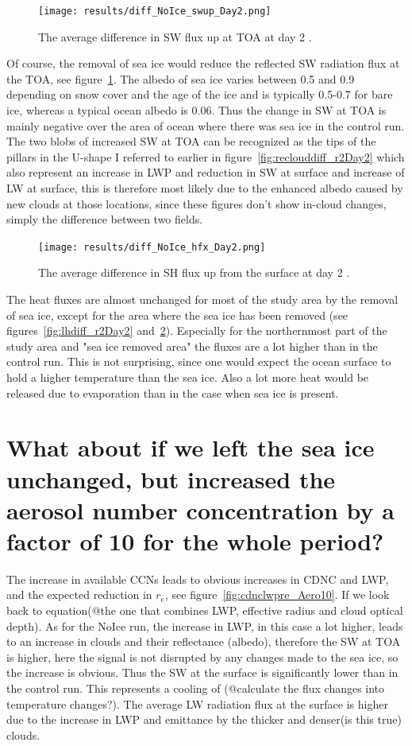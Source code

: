 \begin{figure}
\centering
\texttt{[image: results/diff\_NoIce\_swup\_Day2.png]}
\caption{The average difference in SW flux up at TOA at day 2 .}
\label{fig:swupdiff_r2Day2}
\end{figure}
Of course, the removal of sea ice would reduce the reflected SW radiation flux at the TOA, see figure~\ref{fig:swupdiff_r2Day2}. The albedo of sea ice varies between 0.5 and 0.9 depending on snow cover and the age of the ice and is typically 0.5-0.7 for bare ice, whereas a typical ocean albedo is 0.06. Thus the change in SW at TOA is mainly negative over the area of ocean where there was sea ice in the control run. The two blobs of increased SW at TOA can be recognized as the tips of the pillars in the U-shape I referred to earlier in figure~\ref{fig:reclouddiff_r2Day2} which also represent an increase in LWP and reduction in SW at surface and increase of LW at surface, this is therefore most likely due to the enhanced albedo caused by new clouds at those locations, since these figures don't show in-cloud changes, simply the difference between two fields.

\begin{figure}
\centering
\texttt{[image: results/diff\_NoIce\_hfx\_Day2.png]}
\caption{The average difference in SH flux up from the surface at day 2 .}
\label{fig:shdiff_r2Day2}
\end{figure}

The heat fluxes are almost unchanged for most of the study area by the removal of sea ice, except for the area where the sea ice has been removed (see figures~\ref{fig:lhdiff_r2Day2} and~\ref{fig:shdiff_r2Day2}). Especially for the northernmost part of the study area and "sea ice removed area" the fluxes are a lot higher than in the control run. This is not surprising, since one would expect the ocean surface to hold a higher temperature than the sea ice. Also a lot more heat would be released due to evaporation than in the case when sea ice is present.

\section{What about if we left the sea ice unchanged, but increased the aerosol number concentration by a factor of 10 for the whole period?}
The increase in available CCNs leads to obvious increases in CDNC and LWP, and the expected reduction in $r_e$, see figure~\ref{fig:cdnclwpre_Aero10}. If we look back to equation(@the one that combines LWP, effective radius and cloud optical depth). As for the NoIce run, the increase in LWP, in this case a lot higher, leads to an increase in clouds and their reflectance (albedo), therefore the SW at TOA is higher, here the signal is not disrupted by any changes made to the sea ice, so the increase is obvious. Thus the SW at the surface is significantly lower than in the control run. This represents a cooling of (@calculate the flux changes into temperature changes?). The average LW radiation flux at the surface is higher due to the increase in LWP and emittance by the thicker and denser(is this true) clouds.

